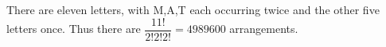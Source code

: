 There are eleven letters, with M,A,T each occurring twice and the other five letters once. Thus there are $\dfrac{11!}{2!2!2!}=\boxed{4989600}$ arrangements.
